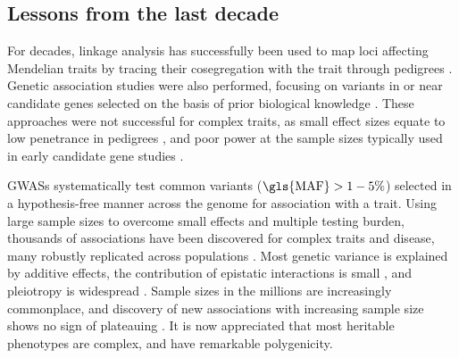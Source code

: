 \begin{outline}
\subsection{Lessons from the last decade}

\1 For decades, linkage analysis has successfully been used to map loci affecting Mendelian traits by tracing their cosegregation with the trait through pedigrees \autocite{visscher2012FiveYearsGWAS}.
Genetic association studies were also performed, focusing on variants in or near candidate genes selected on the basis of prior biological knowledge \autocite{hirschhorn2002ComprehensiveReviewGenetic}.
These approaches were not successful for complex traits, as small effect sizes equate to low penetrance in pedigrees \autocite{visscher2012FiveYearsGWAS},
and poor power at the sample sizes typically used in early candidate gene studies \autocite{border2019NoSupportHistorical}.

\1 \Glspl{GWAS} systematically test common variants ($\text{\gls{MAF}} > 1-5\%$) selected in a hypothesis-free manner across the genome for association with a trait.
Using large sample sizes to overcome small effects and multiple testing burden, thousands of associations have been discovered for complex traits and disease,
many robustly replicated across populations \autocite{visscher2012FiveYearsGWAS,visscher201710YearsGWAS}.
Most genetic variance is explained by additive effects, the contribution of epistatic interactions is small \autocite{visscher2019Fisher1918Paper}, 
and pleiotropy is widespread \autocite{visscher2012FiveYearsGWAS}.
Sample sizes in the millions are increasingly commonplace, 
and discovery of new associations with increasing sample size shows no sign of plateauing \autocite{tam2019BenefitsLimitationsGenomewide}.
It is now appreciated that most heritable phenotypes are complex, and have remarkable polygenicity.



\end{outline}
